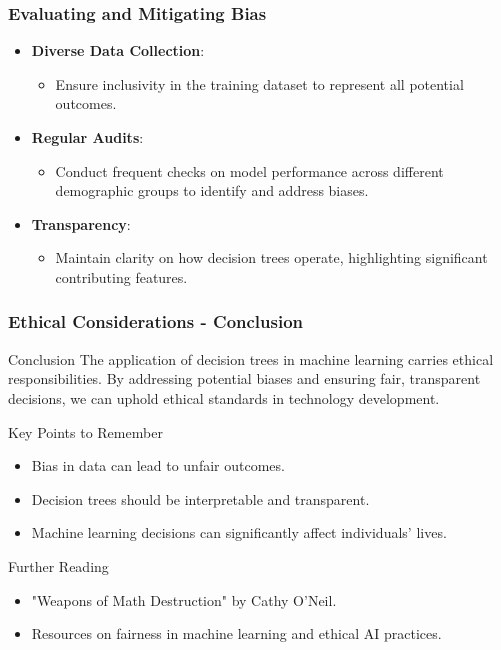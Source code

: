 \documentclass[aspectratio=169]{beamer}
\begin{document}
\begin{frame}[fragile]
    \frametitle{Evaluating and Mitigating Bias}
    \begin{itemize}
        \item \textbf{Diverse Data Collection}: 
        \begin{itemize}
            \item Ensure inclusivity in the training dataset to represent all potential outcomes.
        \end{itemize}
        
        \item \textbf{Regular Audits}: 
        \begin{itemize}
            \item Conduct frequent checks on model performance across different demographic groups to identify and address biases.
        \end{itemize}
        
        \item \textbf{Transparency}: 
        \begin{itemize}
            \item Maintain clarity on how decision trees operate, highlighting significant contributing features.
        \end{itemize}
    \end{itemize}
\end{frame}

\begin{frame}[fragile]
    \frametitle{Ethical Considerations - Conclusion}
    \begin{block}{Conclusion}
        The application of decision trees in machine learning carries ethical responsibilities. 
        By addressing potential biases and ensuring fair, transparent decisions, we can uphold ethical standards in technology development.
    \end{block}
    
    \begin{block}{Key Points to Remember}
        \begin{itemize}
            \item Bias in data can lead to unfair outcomes.
            \item Decision trees should be interpretable and transparent.
            \item Machine learning decisions can significantly affect individuals' lives.
        \end{itemize}
    \end{block}
    
    \begin{block}{Further Reading}
        \begin{itemize}
            \item "Weapons of Math Destruction" by Cathy O'Neil.
            \item Resources on fairness in machine learning and ethical AI practices.
        \end{itemize}
    \end{block}
\end{frame}
\end{document}
